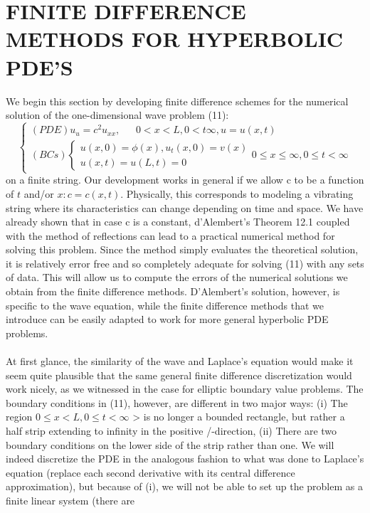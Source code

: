\documentclass[../main.tex]{subfiles}
\begin{document}
\section{FINITE DIFFERENCE METHODS FOR HYPERBOLIC PDE'S}
We begin this section by developing finite difference schemes for the numerical 
solution of the one-dimensional wave problem (11):
$$\begin{cases} 
	(PDE) u_u=c^2u_{xx}, ~~~~~~~ 
	0< x< L, 0<t \infty , u=u(x,t) \\ 
	(BCs)
	\begin{cases} 
	u(x,0)=\phi (x), u_t(x,0)=v(x)\\
	u(x,t)=u(L,t)=0
	\end{cases}
	0 \leqslant x \leqslant\infty, 0\leqslant t< \infty 
\end{cases}$$
on a finite string. Our development works in general if we allow c to be a function 
of $t$ and/or $x: c = c(x,t)$. Physically, this corresponds to modeling a vibrating string 
where its characteristics can change depending on time and space. We have 
already shown that in case c is a constant, d'Alembert's Theorem 12.1 coupled 
with the method of reflections can lead to a practical numerical method for solving 
this problem. Since the method simply evaluates the theoretical solution, it is 
relatively error free and so completely adequate for solving (11) with any sets of 
data. This will allow us to compute the errors of the numerical solutions we obtain 
from the finite difference methods. D'Alembert's solution, however, is specific to 
the wave equation, while the finite difference methods that we introduce can be 
easily adapted to work for more general hyperbolic PDE problems. 
\\
\\
At first glance, the similarity of the wave and Laplace's equation would make it 
seem quite plausible that the same general finite difference discretization would 
work nicely, as we witnessed in the case for elliptic boundary value problems. 
The boundary conditions in (11), however, are different in two major ways: (i) 
The region  
$0 \leqslant x < L, 0 \leqslant t < \infty$
> is no longer a bounded rectangle, but rather a half 
strip extending to infinity in the positive /-direction, (ii) There are two boundary 
conditions on the lower side of the strip rather than one. We will indeed discretize 
the PDE in the analogous fashion to what was done to Laplace's equation (replace 
each second derivative with its central difference approximation), but because of 
(i), we will not be able to set up the problem as a finite linear system (there are 
\end{document}
